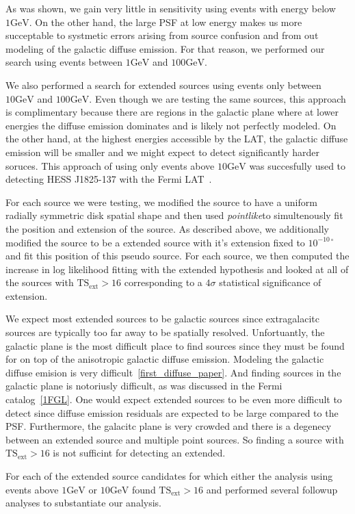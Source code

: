 \documentclass[preprint]{aastex}
\newcommand{\gev}{\text{GeV}}
\newcommand{\tsext}{\ensuremath{\text{TS}_\text{ext}}}
\newcommand{\pointlike}{{\em pointlike}}
\begin{document}
As was shown, we gain very little in sensitivity using events with energy
below $1\gev$. On the other hand, the large PSF at low energy makes us
more succeptable to systmetic errors arising from source confusion and
from out modeling of the galactic diffuse emission.  For that reason,
we performed our search using events between $1\gev$ and $100\gev$.

We also performed a search for extended sources using events only between
$10\gev$ and $100\gev$. Even though we are testing the same sources,
this approach is complimentary because there are regions in the galactic
plane where at lower energies the diffuse emission dominates and is
likely not perfectly modeled. On the other hand, at the highest energies
accessible by the LAT, the galactic diffuse emission will be smaller and
we might expect to detect significantly harder soruces. This approach
of using only events above $10\gev$ was succesfully used to detecting
HESS J1825-137 with the Fermi LAT~\cite{HESS J1825 paper}.

For each source we were testing, we modified the source to have a
uniform radially symmetric disk spatial shape and then used \pointlike to
simultenously fit the position and extension of the source. As described
above, we additionally modified the source to be a extended source with
it's extension fixed to $10^{-10\circ}$ and fit this position of this
pseudo source. For each source, we then computed the increase in log
likelihood fitting with the extended hypothesis and looked at all of
the sources with $\tsext>16$ corresponding to a $4\sigma$ statistical
significance of extension.

We expect most extended sources to be galactic sources since
extragalacitc sources are typically too far away to be spatially
resolved. Unfortuantly, the galactic plane is the most difficult place
to find sources since they must be found for on top of the anisotropic
galactic diffuse emission.  Modeling the galactic diffuse emision is
very difficult~\ref{first_diffuse_paper}.  And finding sources in the
galactic plane is notoriusly difficult, as was discussed in the Fermi
catalog~\ref{1FGL}. One would expect extended sources to be even more
difficult to detect since diffuse emission residuals are expected
to be large compared to the PSF. Furthermore, the galacitc plane
is very crowded and there is a degenecy between an extended source
and multiple point sources. So finding a source with
$\tsext>16$ is not sufficint for detecting an extended.

For each of the extended source candidates for which either the analysis
using events above $1\gev$ or $10\gev$ found $\tsext>16$
and performed several followup analyses to substantiate our analysis.
\end{document}
